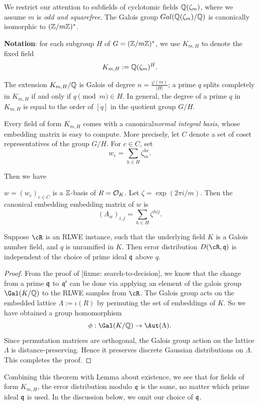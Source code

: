 \documentclass{amsart}
\begin{document}
We restrict our attention to subfields of cyclotomic fields $\mathbb{Q}(\zeta_m)$, where we assume $m$ is {\it odd and squarefree}. The Galois group $Gal(\mathbb{Q}(\zeta_m)/\mathbb{Q})$ is canonically isomorphic to $(\mathbb{Z}/m\mathbb{Z})^*$.

{\bf Notation}: for each subgroup $H$ of $G = (\mathbb{Z}/m\mathbb{Z})^*$, we use $K_{m,H}$ to denote the fixed field
\[
    K_{m,H} := \mathbb{Q}(\zeta_m)^H.
\]

The extension $K_{m,H}/\mathbb{Q}$ is Galois of degree $n = \frac{\varphi(m)}{|H|}$; a prime $q$ splits completely in $K_{m,H}$ if and only if $q \pmod{m} \in H$. In general, the degree of a prime $q$ in $K_{m,H}$ is equal to the order of $[q]$ in the quotient group $G/H$.



Every field of form $K_{m,H}$ comes with a canonical{\it normal integral basis}, whose embedding matrix is easy to compute. More precisely, let $C$ denote a set of coset representatives of the group $G/H$. For $c \in C$, set
\[
    w_c =  \sum_{h \in H} \zeta_m^{hc}.
\]

Then we have
\begin{Prop}
$w = (w_c)_{c \in C}$ is a $\mathbb{Z}$-basis of $R = \mathcal{O}_K$. Let $\zeta = \exp(2\pi i /m)$. Then the canonical embedding embedding matrix of $w$ is
\[
    (A_w)_{i,j} = \sum_{h \in H}{\zeta^{hij}}.
\]
\end{Prop}
\begin{Prop}
Suppose $\cR$ is an RLWE instance, such that the underlying field $K$ is a Galois number field, and $q$ is unramified in $K$. Then error distribution $D(\cR, \fq)$ is independent of the choice of prime ideal $\mathfrak{q}$ above $q$.
\end{Prop}

\begin{proof}
From the proof of [fixme: search-to-decision], we know that the change from a prime $\mathfrak{q}$ to $\mathfrak{q}'$ can be done via applying an element of the galois group $\Gal(K/\bQ)$ to the RLWE samples from $\cR$. The Galois group acts on the embedded lattice $\Lambda := \iota(R)$ by permuting the set of embeddings of $K$. So we have obtained a group homomorphism $$\phi: \Gal(K/\bQ) \to \Aut(\Lambda).$$
Since permutation matrices are orthogonal, the Galois group action on the lattice $\Lambda$ is distance-preserving. Hence it preserves discrete Gaussian distributions on $\Lambda$. This completes the proof.
\end{proof}

Combining this theorem with Lemma about existence, we see that for fields of form $K_{m,H}$, the error distribution modulo $\mathfrak{q}$ is the same, no matter which prime ideal $\mathfrak{q}$ is used. In the discussion below, we omit our choice of $\mathfrak{q}$.
\end{document}
